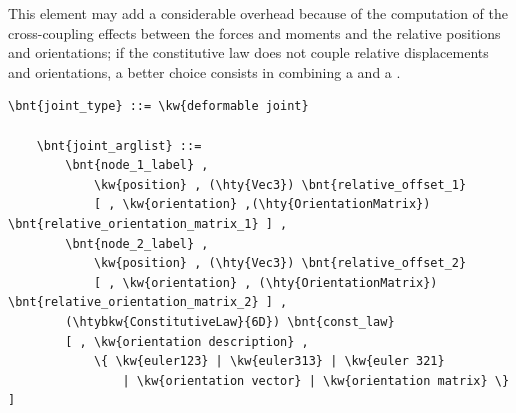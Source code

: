 \noindent
This element may add a considerable overhead because of the computation
of the cross-coupling effects between the forces and moments and the
relative positions and orientations; if the constitutive law does not couple
relative displacements and orientations, a better choice consists 
in combining a  and a .
\begin{Verbatim}[commandchars=\\\{\}]
    \bnt{joint_type} ::= \kw{deformable joint}

    \bnt{joint_arglist} ::= 
        \bnt{node_1_label} ,
            \kw{position} , (\hty{Vec3}) \bnt{relative_offset_1}
            [ , \kw{orientation} ,(\hty{OrientationMatrix}) \bnt{relative_orientation_matrix_1} ] ,
        \bnt{node_2_label} ,
            \kw{position} , (\hty{Vec3}) \bnt{relative_offset_2}
            [ , \kw{orientation} , (\hty{OrientationMatrix}) \bnt{relative_orientation_matrix_2} ] ,
        (\htybkw{ConstitutiveLaw}{6D}) \bnt{const_law}
        [ , \kw{orientation description} ,
            \{ \kw{euler123} | \kw{euler313} | \kw{euler 321}
                | \kw{orientation vector} | \kw{orientation matrix} \} ]
\end{Verbatim}

